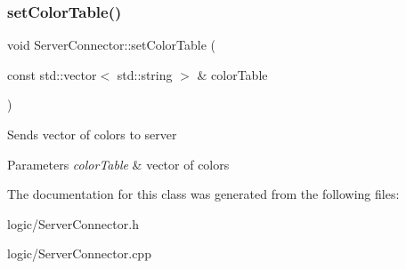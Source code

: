 \subsubsection{\texorpdfstring{set\+Color\+Table()}{setColorTable()}}
{\footnotesize\ttfamily void Server\+Connector\+::set\+Color\+Table (\begin{DoxyParamCaption}\item[{const std\+::vector$<$ std\+::string $>$ \&}]{color\+Table }\end{DoxyParamCaption})}

Sends vector of colors to server 
\begin{DoxyParams}{Parameters}
{\em color\+Table} & vector of colors \\
\hline
\end{DoxyParams}


The documentation for this class was generated from the following files\+:\begin{DoxyCompactItemize}
\item 
logic/Server\+Connector.\+h\item 
logic/Server\+Connector.\+cpp\end{DoxyCompactItemize}

